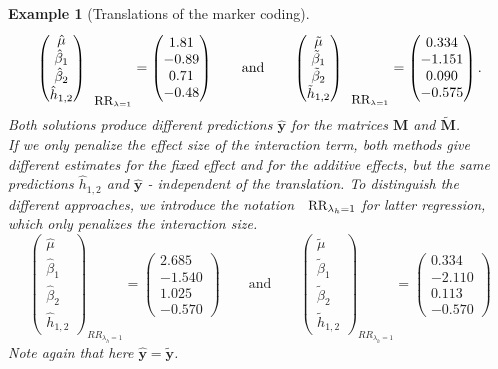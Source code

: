 \documentclass{bmcart}
\newtheorem{example}{Example}
\newcommand{\M}{\mathbf{M}}
\newcommand{\0}{\mathbf{0}}
\begin{document}
\begin{example}[Translations of the marker coding]
	$$\begin{pmatrix}
	\hat{\mu} \\
	\hat{\beta}_1 \\
	\hat{\beta}_2 \\
	\hat{h}_{1,2}
	\end{pmatrix}_{\mbox{\small RR}_{\lambda = 1}} = \begin{pmatrix}
	1.81\\
	-0.89\\
	0.71\\
	-0.48
	\end{pmatrix}
	\qquad \mbox{and} \qquad \begin{pmatrix}
	\tilde{\mu} \\
	\tilde{\beta}_1 \\
	\tilde{\beta}_2 \\
	\tilde{h}_{1,2}
	\end{pmatrix}_{\mbox{\small RR}_{\lambda = 1}}= \begin{pmatrix}
	0.334\\
	-1.151 \\
	0.090 \\
	-0.575
	\end{pmatrix}. $$
	Both solutions produce different predictions $\hat{\mathbf{y}}$ for the matrices $\M$ and $\tilde{\M}$. \\
	
	If we only penalize the effect size of the interaction term, both methods give different estimates for the fixed effect and for the additive effects, but the same predictions $\hat{h}_{1,2}$ and $\hat{\mathbf{y}}$ - independent of the translation. 
	To distinguish the different approaches, we introduce the notation $\mbox{\small RR}_{\lambda_h = 1}$ for latter regression, which only penalizes the interaction size. 
	$$\begin{pmatrix}
	\hat{\mu} \\
	\hat{\beta}_1 \\
	\hat{\beta}_2 \\
	\hat{h}_{1,2}
	\end{pmatrix}_{RR_{\lambda_h = 1}} = \begin{pmatrix}
	2.685\\
	-1.540\\
	1.025\\
	-0.570
	\end{pmatrix}
	\qquad \mbox{and} \qquad \begin{pmatrix}
	\tilde{\mu} \\
	\tilde{\beta}_1 \\
	\tilde{\beta}_2 \\
	\tilde{h}_{1,2}
	\end{pmatrix}_{RR_{\lambda_h = 1}}= \begin{pmatrix}
	0.334\\
	-2.110 \\
	0.113\\
	-0.570
	\end{pmatrix} $$
	Note again that here $\hat{\mathbf{y}}=\tilde{\mathbf{y}}$. 
\end{example}
\end{document}
